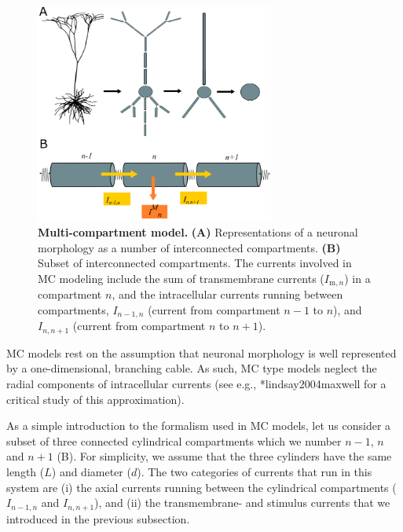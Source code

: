 \begin{figure}[!ht]
\begin{center}
\includegraphics[width=0.7\textwidth]{Figures/Neuron/multikompis.png}
\end{center}
\caption{\textbf{Multi-compartment model.} {\bf (A)} Representations of a neuronal morphology as a number of interconnected compartments. {\bf (B)} Subset of interconnected compartments. The currents involved in MC modeling include the sum of transmembrane currents ($I_{\mathrm{m},n}$) in a compartment $n$, and the intracellular currents running between 
compartments, $I_{n-1,n}$ (current from compartment $n-1$ to $n$), and $I_{n,n+1}$ (current from compartment $n$ to $n+1$).
}
\label{fig:Neuron:multikompisen}
\end{figure}

MC models rest on the assumption that neuronal morphology is well represented by a one-dimensional, branching cable. As such, MC type models neglect the radial components of intracellular currents (see e.g., \citeasnoun**{lindsay2004maxwell} for a critical study of this approximation). 

As a simple introduction to the formalism used in MC models, let us consider a subset of three connected cylindrical compartments which we number $n-1$, $n$ and $n+1$ (B). For simplicity, we assume that the three cylinders have the same length ($L$) and diameter ($d$). The two categories of currents that run in this system are (i) the axial currents running between the cylindrical compartments ($I_{n-1,n}$ and $I_{n,n+1}$), and (ii) the transmembrane- and stimulus currents that we introduced in the previous subsection. 

